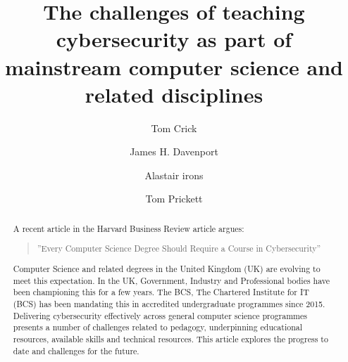 \documentclass[sigconf]{acmart}
\begin{document}
\title{The challenges of teaching cybersecurity as part of mainstream computer science and related disciplines}




\author{Tom Crick}


\author{James H. Davenport}

\author{Alastair irons}

\author{Tom Prickett}


\renewcommand{\shortauthors}{Crick, Davenport,  Irons, and Prickett.}
\begin{abstract}
  A recent article in the Harvard Business Review article argues:
  \begin{quote}
      ''Every Computer Science Degree Should Require a Course in Cybersecurity''\cite{cable_2019}
  \end{quote}
   Computer Science and related degrees in the United Kingdom (UK) are evolving to meet this expectation. In the UK, Government, Industry and Professional bodies have been championing this for a few years. The BCS, The Chartered Institute for IT (BCS) has been mandating this in accredited undergraduate programmes since 2015\cite{Cricketal2019}. Delivering cybersecurity effectively across general computer science programmes presents a number of challenges related to pedagogy, underpinning educational resources, available skills and technical resources. This article explores the progress to date and challenges for the future.
\end{abstract}
\end{document}
